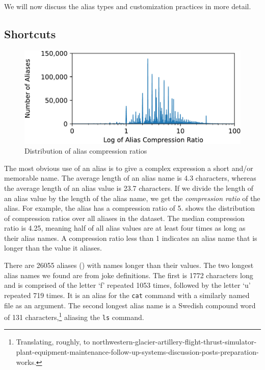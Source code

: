 We will now discuss the alias types and customization practices in more detail.

\subsection{Shortcuts}

\begin{figure}
    \centering
    \includegraphics[width=0.95\columnwidth]{figures/compression.pdf}
    \caption{Distribution of alias compression ratios}
    \label{fig:compression}
\end{figure}

The most obvious use of an alias is to give a complex expression a short and/or memorable name.
The average length of an alias name is 4.3 characters, whereas the average length of an alias value is 23.7 characters.
If we divide the length of an alias value by the length of the alias name, we get the \emph{compression ratio} of the alias.
For example, the alias  has a compression ratio of 5.
 shows the distribution of compression ratios over all aliases in the dataset.
The median compression ratio is 4.25, meaning half of all alias values are at least four times as long as their alias names.
A compression ratio less than 1 indicates an alias name that is longer than the value it aliases.

There are \num{26055} aliases () with names longer than their values.
The two longest alias names we found are from joke definitions.
The first is \num{1772} characters long and is comprised of the letter `f' repeated \num{1053} times, followed by the letter `u' repeated 719 times.
It is an alias for the \verb|cat| command with a similarly named file as an argument.
The second longest alias name is a Swedish compound word of \num{131} characters,\footnote{Translating, roughly, to northwestern-glacier-artillery-flight-thrust-simulator-plant-equipment-maintenance-follow-up-systems-discussion-posts-preparation-works.} aliasing the \verb|ls| command.

